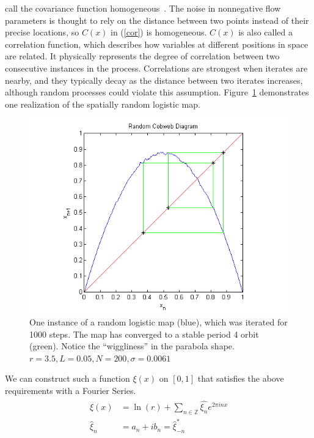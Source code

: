 call the covariance function
homogeneous~\cite{gelhar}. The noise in nonnegative flow parameters is
thought to rely on the distance between two points instead of their
precise locations, so $C(x)$ in (\ref{cor}) is
homogeneous. $C(x)$ is also called a correlation function, which
describes how variables at different positions in space are
related. It physically represents the degree of correlation between
two consecutive instances in the process. Correlations are strongest
when iterates are nearby, and they typically decay as the distance
between two iterates increases, although random processes could violate this assumption. 
Figure~\ref{fig:rlogstable} demonstrates one realization of the
spatially random logistic map.
\begin{figure}[!h]
\caption[Random logistic map, stable orbit]{One instance of a random
  logistic map (blue), which was iterated for 1000 steps. The map has converged to a stable period 4 orbit (green). Notice the
  ``wiggliness'' in the parabola shape. $r=3.5,L=0.05,N=200,\sigma=0.0061$}\label{fig:rlogstable}
	\begin{center}
		\includegraphics[scale=0.7]{figs/rand_cobweb.png}
	\end{center}
\end{figure}
We can construct such a
function $\xi(x)$ on $[0,1]$ that satisfies the above requirements with a Fourier
Series.
\begin{align}\label{fs1}
\begin{split}
\xi(x) &= \ln(r) + \sum_{n \in \mathbb{Z}}\hat{\xi_n}e^{2\pi inx}\\
\hat{\xi}_n &= a_n + ib_n = \hat{\xi}_{-n}^*
\end{split}
\end{align}
